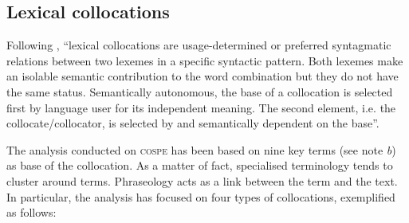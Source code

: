 \documentclass[output=paper]{LSP/langsci}
\begin{document}
\subsection{Lexical collocations}
Following \citet[43]{Granger2008}, “lexical collocations are usage-deter\-mined or preferred syntagmatic relations between two lexemes in a specific syntactic pattern. Both lexemes make an isolable semantic contribution to the word combination but they do not have the same status. Semantically autonomous, the base of a collocation is selected first by language user for its independent meaning. The second element, i.e. the collocate/collocator, is selected by and semantically dependent on the base”.

The analysis conducted on \textsc{cospe} has been based on nine key terms (see note \textit{b}) as base of the \enlargethispage{1\baselineskip} collocation. As a matter of fact, specialised terminology tends to cluster around terms. Phraseology acts as a link between the term and the text. In particular, the analysis has focused on four types of collocations, exemplified as follows:
\end{document}
